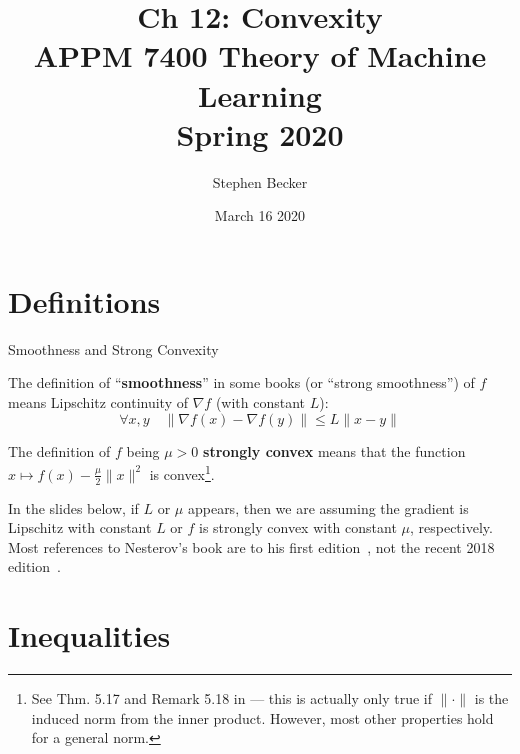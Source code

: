 \documentclass[10pt,handout]{beamer}
\title[Ch 12: inequalities]{Ch 12: Convexity\\APPM 7400 Theory of Machine Learning\\Spring 2020}
\author{Stephen Becker}
\institute[CU]{University of Colorado Boulder}
\date[APPM 7400 Theory of ML]{March 16 2020}
\begin{document}
\begin{frame}
    \titlepage
\end{frame}


\section{Definitions}


\begin{frame}{Smoothness and Strong Convexity}


The definition of ``\textbf{smoothness}'' in some books (or ``strong smoothness'') of $f$ means  Lipschitz continuity of $\nabla f$  (with constant $L$):
\begin{equation} \label{eq:LL}
    \forall x, y\quad \| \nabla f(x) - \nabla f(y) \| \le L \|x-y\|
\end{equation}
\medskip 

The definition of $f$ being $\mu>0$ \textbf{strongly convex} means that the function $x \mapsto f(x) - \frac{\mu}{2}\|x\|^2$ is convex\footnote{
    See Thm. 5.17 and Remark 5.18 in \cite{BeckBook} --- this is actually only true if $\|\cdot\|$ is the induced norm from the inner product. However, most other properties hold for a general norm.
}. 

\medskip
In the slides below, if $L$ or $\mu$ appears, then we are assuming the gradient is Lipschitz with constant $L$ or $f$ is strongly convex with constant $\mu$, respectively. Most references to Nesterov's book are to his first edition~\cite{Nesterov_2004}, not the recent 2018  edition~\cite{Nesterov_2018}.

\end{frame}

\section{Inequalities}
\end{document}
